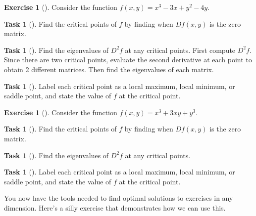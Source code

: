 \documentclass[10pt,]{book}
\theoremstyle{plain}
\theoremstyle{definition}
\theoremstyle{definition}
\theoremstyle{definition}
\theoremstyle{definition}
\newtheorem{exploration}[project]{Exercise}
\newtheorem{task}[project]{Task}
\theoremstyle{definition}
\numberwithin{equation}{section}
\begin{document}
\begin{exploration}[]\label{exploration-237}
Consider the function \(f(x,y)=x^3-3x+y^2-4y\).%
\begin{task}[]\label{task-633}
Find the critical points of \(f\) by finding when \(Df(x,y)\) is the zero matrix.%
\end{task}
\begin{task}[]\label{task-634}
Find the eigenvalues of \(D^2f\) at any critical points. First compute \(D^2f\). Since there are two critical points, evaluate the second derivative at each point to obtain 2 different matrices. Then find the eigenvalues of each matrix.%
%
\end{task}
\begin{task}[]\label{task-635}
Label each critical point as a local maximum, local minimum, or saddle point, and state the value of \(f\) at the critical point.%
\end{task}
\end{exploration}
\begin{exploration}[]\label{exploration-238}
Consider the function \(f(x,y)=x^3 + 3xy +y^3\).%
\begin{task}[]\label{task-636}
Find the critical points of \(f\) by finding when \(Df(x,y)\) is the zero matrix.%
\end{task}
\begin{task}[]\label{task-637}
Find the eigenvalues of \(D^2f\) at any critical points.%
\end{task}
\begin{task}[]\label{task-638}
Label each critical point as a local maximum, local minimum, or saddle point, and state the value of \(f\) at the critical point.%
\end{task}
\end{exploration}
You now have the tools needed to find optimal solutions to exercises in any dimension. Here's a silly exercise that demonstrates how we can use this.%
\end{document}
